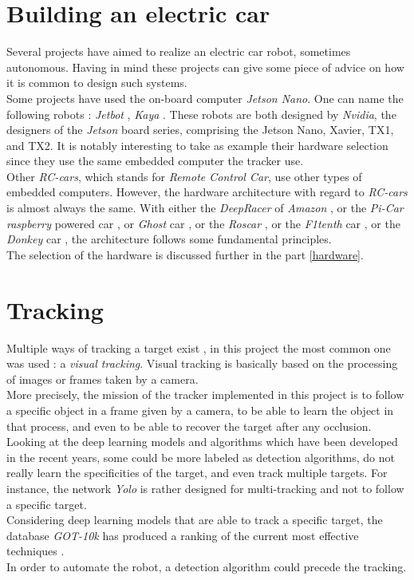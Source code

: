 		\section{Building an electric car}\label{buildingcar}
		
		Several projects have aimed to realize an electric car robot, sometimes autonomous. 
		Having in mind these projects can give some piece of advice on how it is common 
		to design such systems.
		\\\indent Some projects have used the on-board computer \textit{Jetson Nano}. 
		One can name the following robots : \textit{Jetbot} \cite{jetbot}, \textit{Kaya} \cite{kaya}.
		These robots are both designed by \textit{Nvidia}, the designers of the 
		\textit{Jetson} board series, comprising the Jetson Nano, Xavier, TX1, and TX2. It 
		is notably interesting to take as example their hardware selection since they
		use the same embedded computer the tracker use.
		\\\indent Other \textit{RC-cars}, which stands for \textit{Remote Control Car}, use other types of embedded computers.
		However, the hardware architecture with regard to \textit{RC-cars} is 
		almost always the same. With either the \textit{DeepRacer} of \textit{Amazon} \cite{deepracer}, or
		the \textit{Pi-Car} \textit{raspberry} powered car \cite{rasp}, or 
		\textit{Ghost} car \cite{ghost}, or the \textit{Roscar} \cite{roscar}, or
		the \textit{F1tenth} car \cite{f1tenth}, or the \textit{Donkey} car \cite{donkey}, the architecture
		follows some fundamental principles.
		\\\indent The selection of the hardware is discussed further in the part \vref{hardware}.
		
		\section{Tracking}\label{statearttracking}
		
		Multiple ways of tracking a target exist \cite{learnopencvtracking}, in this project the most
		common one was used : a \textit{visual tracking}. Visual tracking
		is basically based on the processing of images or frames taken by a camera. 
		\\\indent More precisely, the mission of the tracker implemented
		in this project is to follow
		a specific object in a frame given by a camera, to be able to 
		learn the object in that process, and even to be able to recover the target after 
		any occlusion. Looking at the deep learning models and algorithms 
		which have been developed in the recent years,
		some could be more labeled as detection algorithms, do not really learn the specificities 
		of the target, and even track multiple targets. For instance, the network \textit{Yolo} 
		\cite{bjelonicYolo2018} is rather designed for multi-tracking and 		not to follow a specific target. 
		\\\indent Considering deep learning models that are able to 
		track a specific target, the database \textit{GOT-10k} has produced
		a ranking of the current most effective techniques \cite{trakinglist}.
		\\\indent In order to automate the robot, a detection algorithm
		could precede the tracking.
		 
